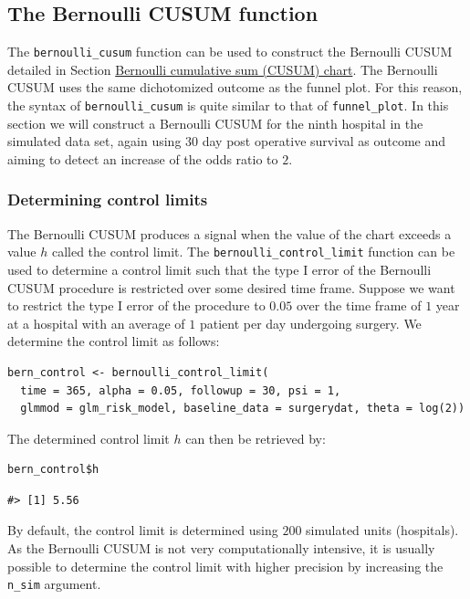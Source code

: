 \hypertarget{sec:bernoullicusumfunction}{%
\subsection{The Bernoulli CUSUM function}\label{sec:bernoullicusumfunction}}

The \texttt{bernoulli\_cusum} function can be used to construct the Bernoulli CUSUM detailed in Section \protect\hyperlink{BernoulliCUSUM}{Bernoulli cumulative sum (CUSUM) chart}. The Bernoulli CUSUM uses the same dichotomized outcome as the funnel plot. For this reason, the syntax of \texttt{bernoulli\_cusum} is quite similar to that of \texttt{funnel\_plot}. In this section we will construct a Bernoulli CUSUM for the ninth hospital in the simulated data set, again using \(30\) day post operative survival as outcome and aiming to detect an increase of the odds ratio to \(2\).

\hypertarget{determining-control-limits}{%
\subsubsection{Determining control limits}\label{determining-control-limits}}

The Bernoulli CUSUM produces a signal when the value of the chart exceeds a value \(h\) called the control limit. The \texttt{bernoulli\_control\_limit} function can be used to determine a control limit such that the type I error of the Bernoulli CUSUM procedure is restricted over some desired time frame. Suppose we want to restrict the type I error of the procedure to \(0.05\) over the time frame of \(1\) year at a hospital with an average of \(1\) patient per day undergoing surgery. We determine the control limit as follows:

\begin{verbatim}
bern_control <- bernoulli_control_limit(
  time = 365, alpha = 0.05, followup = 30, psi = 1, 
  glmmod = glm_risk_model, baseline_data = surgerydat, theta = log(2))
\end{verbatim}

The determined control limit \(h\) can then be retrieved by:

\begin{verbatim}
bern_control$h
\end{verbatim}

\begin{verbatim}
#> [1] 5.56
\end{verbatim}

By default, the control limit is determined using \(200\) simulated units (hospitals). As the Bernoulli CUSUM is not very computationally intensive, it is usually possible to determine the control limit with higher precision by increasing the \texttt{n\_sim} argument.

